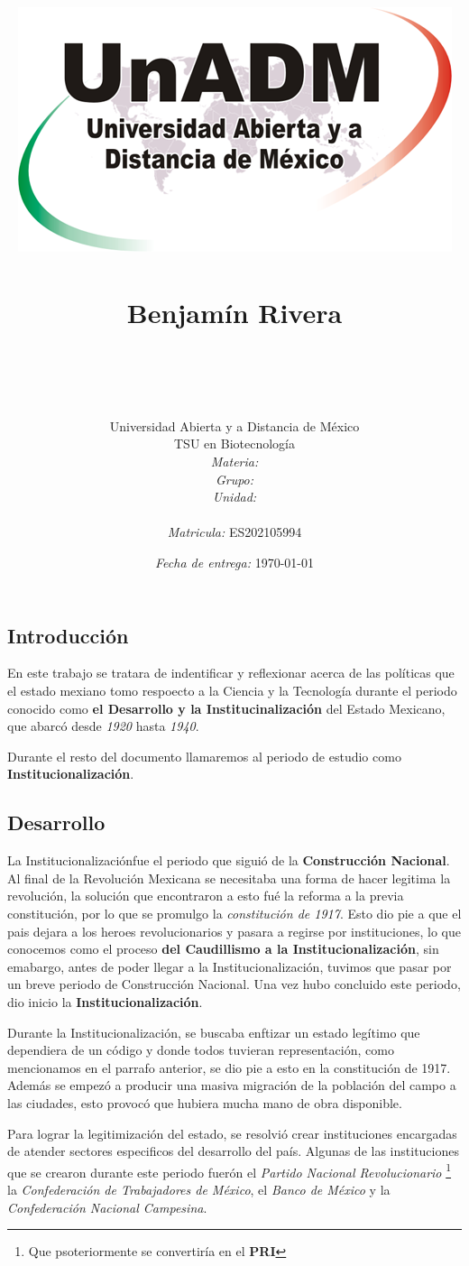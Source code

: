 \documentclass[12pt]{article}
\title{
	\includegraphics{../../../assets/logo-unadm} \\
	\ \\ Benjam\'in Rivera \\
	\bf{\titulo}\\\ \\}
\author{
	Universidad Abierta y a Distancia de México \\
	TSU en Biotecnolog\'ia \\
	\textit{Materia:} \materia \\
	\textit{Grupo:} \grupo \\
	\textit{Unidad:} \unidad \\
	\\
	\textit{Matricula:} ES202105994 }
\date{\textit{Fecha de entrega:} \today}
\newcommand{\periodo}[0]{Institucionalizaci\'on}
\begin{document}
\maketitle\newpage

\subsection*{Introducci\'on}	

	\par En este trabajo se tratara de indentificar y reflexionar acerca de las pol\'iticas que el estado mexiano tomo respoecto a la Ciencia y la Tecnolog\'ia durante el periodo conocido como \textbf{el Desarrollo y la Institucinalizaci\'on} del Estado Mexicano, que abarc\'o desde \textit{1920} hasta \textit{1940}.

	\par Durante el resto del documento llamaremos al periodo de estudio como \textbf{\periodo}.
	
	
\subsection*{Desarrollo}

	\par La \periodo fue el periodo que sigui\'o de la \textbf{Construcci\'on Nacional}. Al final de la Revoluci\'on Mexicana se necesitaba una forma de hacer legitima la revoluci\'on, la soluci\'on que encontraron a esto fu\'e la reforma a la previa constituci\'on, por lo que se promulgo la \textit{constituci\'on de 1917}. Esto dio pie a que el pais dejara a los heroes revolucionarios y pasara a regirse por instituciones, lo que conocemos como el proceso \textbf{del Caudillismo a la \periodo}, sin emabargo, antes de poder llegar a la \periodo, tuvimos que pasar por un breve periodo de Construcci\'on Nacional. Una vez hubo concluido este periodo, dio inicio la \textbf{\periodo}.
	
	\par Durante la \periodo, se buscaba enftizar un estado leg\'itimo que dependiera de un c\'odigo y donde todos tuvieran representaci\'on, como mencionamos en el parrafo anterior, se dio pie a esto en la constituci\'on de 1917. Adem\'as se empez\'o a producir una masiva migraci\'on de la poblaci\'on del campo a las ciudades, esto provoc\'o que hubiera mucha mano de obra disponible. 
	
	\par Para lograr la legitimizaci\'on del estado, se resolvi\'o crear instituciones encargadas de atender sectores especificos del desarrollo del pa\'is. Algunas de las instituciones que se crearon durante este periodo fuer\'on el \textit{Partido Nacional Revolucionario}
\footnote{Que psoteriormente se convertir\'ia en el \textbf{PRI}}
	la \textit{Confederaci\'on de Trabajadores de M\'exico}, el \textit{Banco de M\'exico} y la \textit{Confederaci\'on Nacional Campesina}.
	
\end{document}
